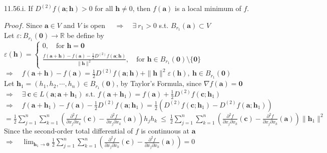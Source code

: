 \documentclass[12pt]{book}
\begin{document}
\begin{CJK}{UTF8}{bsmi}
11.56.i. If $D^{(2)}f(\mathbf{a};\mathbf{h})>0$ for all $\mathbf{h}\ne0$, then $f(\mathbf{a})$ is a local minimum of $f$. 

$Proof$. Since $\mathbf{a}\in V$ and $V$ is open $\quad\Rightarrow\quad\exists\ r_1>0$ s.t. $B_{r_1}(\mathbf{a})\subset V$ \\
Let $\varepsilon : B_{r_1}(\mathbf{0})\rightarrow\mathbb{R}$ be define by $\displaystyle\varepsilon(\mathbf{h})=\left\{\begin{matrix}
0,\quad\text{for\ }\mathbf{h}=\mathbf{0} \\
\displaystyle\frac{f(\mathbf{a}+\mathbf{h})-f(\mathbf{a})-\frac{1}{2}D^{(2)}f(\mathbf{a};\mathbf{h})}{\parallel\mathbf{h}\parallel^2},\quad\text{for\ }\mathbf{h}\in B_{r_1}(\mathbf{0})\setminus\{\mathbf{0}\}
\end{matrix}\right.$ \\
$\displaystyle\Rightarrow\quad f(\mathbf{a}+\mathbf{h})-f(\mathbf{a})=\frac{1}{2}D^{(2)}f(\mathbf{a};\mathbf{h})+\parallel\mathbf{h}\parallel^2\varepsilon(\mathbf{h}),\ \mathbf{h}\in B_{r_1}(\mathbf{0})$ \\
Let $\mathbf{h}_1=(h_1, h_2, \cdots, h_n)\in B_{r_1}(\mathbf{0})$, by Taylor's Formula, since $\nabla f(\mathbf{a})=\mathbf{0}$ \\
$\Rightarrow\quad\exists\ \mathbf{c}\in L(\mathbf{a};\mathbf{a}+\mathbf{h}_1)$ s.t. $\displaystyle f(\mathbf{a}+\mathbf{h}_1)=f(\mathbf{a})+\frac{1}{2}D^{(2)}f(\mathbf{c};\mathbf{h}_1)$ \\
$\displaystyle\Rightarrow\quad f(\mathbf{a}+\mathbf{h}_1)-f(\mathbf{a})-\frac{1}{2}D^{(2)}f(\mathbf{a};\mathbf{h}_1)=\frac{1}{2}\left(D^{(2)}f(\mathbf{c};\mathbf{h}_1)-D^{(2)}f(\mathbf{a};\mathbf{h}_1)\right)$ \\
\hspace*{2em}$\displaystyle=\frac{1}{2}\sum_{j=1}^n\sum_{k=1}^n\left(\frac{\partial^2 f}{\partial x_j\partial x_k}(\mathbf{c})-\frac{\partial^2 f}{\partial x_j\partial x_k}(\mathbf{a})\right)h_jh_k\ 
\le\ \frac{1}{2}\sum_{j=1}^n\sum_{k=1}^n\left(\frac{\partial^2 f}{\partial x_j\partial x_k}(\mathbf{c})-\frac{\partial^2 f}{\partial x_j\partial x_k}(\mathbf{a})\right)\parallel\mathbf{h}_1\parallel^2$ \\
Since the second-order total differential of $f$ is continuous at $\displaystyle\mathbf{a}$ \\
$\displaystyle\Rightarrow\quad\lim_{\mathbf{h}_1\rightarrow\mathbf{0}}\frac{1}{2}\sum_{j=1}^n\sum_{k=1}^n\left(\frac{\partial^2 f}{\partial x_j\partial x_k}(\mathbf{c})-\frac{\partial^2 f}{\partial x_j\partial x_k}(\mathbf{a})\right)=0$ \\

\end{CJK}
\end{document}
